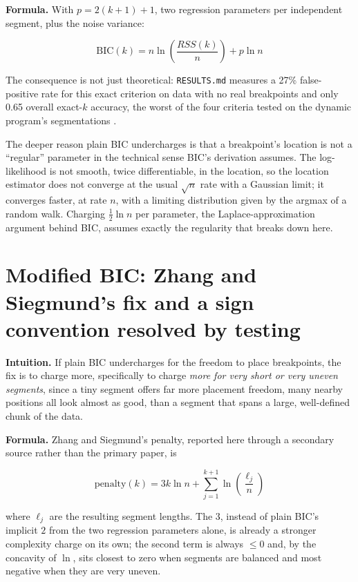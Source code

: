 \documentclass[11pt]{article}
\newcommand{\code}[1]{\texttt{#1}}
\begin{document}
\textbf{Formula.} With $p = 2(k+1) + 1$, two regression parameters per
independent segment, plus the noise variance:

\begin{equation}
\mathrm{BIC}(k) = n \ln\!\left(\frac{RSS(k)}{n}\right) + p \ln n
\end{equation}

The consequence is not just theoretical: \code{RESULTS.md} measures a 27\%
false-positive rate for this exact criterion on data with no real
breakpoints and only 0.65 overall exact-$k$ accuracy, the worst of the
four criteria tested on the dynamic program's segmentations
\citep{yao1988} \citep{zhangsiegmund2007}.

The deeper reason plain BIC undercharges is that a breakpoint's location is
not a ``regular'' parameter in the technical sense BIC's derivation
assumes. The log-likelihood is not smooth, twice differentiable, in the
location, so the location estimator does not converge at the usual
$\sqrt n$ rate with a Gaussian limit; it converges faster, at rate $n$, with
a limiting distribution given by the argmax of a random walk. Charging
$\frac{1}{2}\ln n$ per parameter, the Laplace-approximation argument behind
BIC, assumes exactly the regularity that breaks down here.

\section{Modified BIC: Zhang and Siegmund's fix and a sign convention resolved by testing}

\textbf{Intuition.} If plain BIC undercharges for the freedom to place
breakpoints, the fix is to charge more, specifically to charge \emph{more
for very short or very uneven segments}, since a tiny segment offers far
more placement freedom, many nearby positions all look almost as good, than
a segment that spans a large, well-defined chunk of the data.

\textbf{Formula.} Zhang and Siegmund's penalty, reported here through a
secondary source rather than the primary paper, is

\begin{equation}
\text{penalty}(k) = 3k \ln n + \sum_{j=1}^{k+1} \ln\!\left(\frac{\ell_j}{n}\right)
\end{equation}

where $\ell_j$ are the resulting segment lengths. The $3$, instead of plain
BIC's implicit $2$ from the two regression parameters alone, is already a
stronger complexity charge on its own; the second term is always $\le 0$
and, by the concavity of $\ln$, sits closest to zero when segments are
balanced and most negative when they are very uneven.
\end{document}
